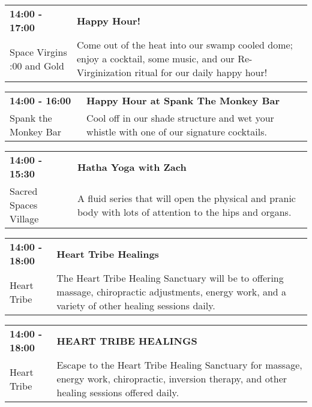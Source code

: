 \begin{tabular}{ p{1in} p{2.2in} }
    \textbf{14:00 - 17:00} & \textbf{Happy Hour!} \\
    Space Virgins \newline 6:00 and Gold & Come out of the heat into our swamp cooled dome; enjoy a cocktail, some music, and our Re-Virginization ritual for our daily happy hour! \\
    \hline 
\end{tabular}
    
\begin{tabular}{ p{1in} p{2.2in} }
    \textbf{14:00 - 16:00} & \textbf{Happy Hour at Spank The Monkey Bar} \\
    Spank the Monkey Bar \newline  & Cool off in our shade structure and wet your whistle with one of our signature cocktails. \\
    \hline 
\end{tabular}
    
\begin{tabular}{ p{1in} p{2.2in} }
    \textbf{14:00 - 15:30} & \textbf{Hatha Yoga with Zach} \\
    Sacred Spaces Village \newline  & A fluid series that will open the physical and pranic body with lots of attention to the hips and organs. \\
    \hline 
\end{tabular}
    
\begin{tabular}{ p{1in} p{2.2in} }
    \textbf{14:00 - 18:00} & \textbf{Heart Tribe Healings} \\
    Heart Tribe \newline  & The Heart Tribe Healing Sanctuary will be to offering massage, chiropractic adjustments, energy work, and a variety of other healing sessions daily. \\
    \hline 
\end{tabular}
    
\begin{tabular}{ p{1in} p{2.2in} }
    \textbf{14:00 - 18:00} & \textbf{HEART TRIBE HEALINGS} \\
    Heart Tribe \newline  & Escape to the Heart Tribe Healing Sanctuary for massage, energy work, chiropractic, inversion therapy, and other healing sessions offered daily. \\
    \hline 
\end{tabular}
    
